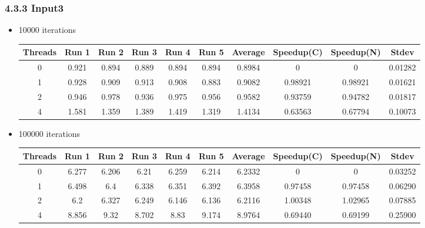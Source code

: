 \documentclass{article}
\begin{document}
\subsubsection*{4.3.3 Input3} 
 \begin{itemize}
\item 10000 iterations
\begin{center}
 \begin{adjustbox}{width=\columnwidth, center} 
 \begin{tabular}{ | |c | c c c c c | c | c c | c | |} \hline 
 Threads & Run 1 & Run 2 & Run 3 & Run 4 & Run 5 & Average & Speedup(C) & Speedup(N) & Stdev \\ [0.5ex] 
 \hline 
 \hline 
0& 0.921 & 0.894 & 0.889 & 0.894 & 0.894 & 0.8984 & 0 & 0 & 0.01282\\ 
 \hline
1& 0.928 & 0.909 & 0.913 & 0.908 & 0.883 & 0.9082 & 0.98921 & 0.98921 & 0.01621\\ 
 \hline
2& 0.946 & 0.978 & 0.936 & 0.975 & 0.956 & 0.9582 & 0.93759 & 0.94782 & 0.01817\\ 
 \hline
4& 1.581 & 1.359 & 1.389 & 1.419 & 1.319 & 1.4134 & 0.63563 & 0.67794 & 0.10073\\ 
 \hline
\end{tabular} 
 \end{adjustbox} 
 \end{center} 
\item 100000 iterations
\begin{center}
 \begin{adjustbox}{width=\columnwidth, center} 
 \begin{tabular}{ | |c | c c c c c | c | c c | c | |} \hline 
 Threads & Run 1 & Run 2 & Run 3 & Run 4 & Run 5 & Average & Speedup(C) & Speedup(N) & Stdev \\ [0.5ex] 
 \hline 
 \hline 
0& 6.277 & 6.206 & 6.21 & 6.259 & 6.214 & 6.2332 & 0 & 0 & 0.03252\\ 
 \hline
1& 6.498 & 6.4 & 6.338 & 6.351 & 6.392 & 6.3958 & 0.97458 & 0.97458 & 0.06290\\ 
 \hline
2& 6.2 & 6.327 & 6.249 & 6.146 & 6.136 & 6.2116 & 1.00348 & 1.02965 & 0.07885\\ 
 \hline
4& 8.856 & 9.32 & 8.702 & 8.83 & 9.174 & 8.9764 & 0.69440 & 0.69199 & 0.25900\\ 
 \hline
\end{tabular} 
 \end{adjustbox} 
 \end{center} 
\end{itemize}
\end{document}
